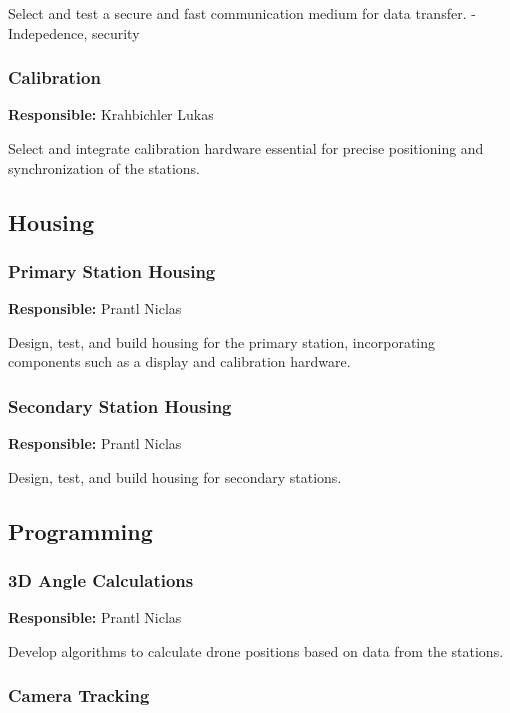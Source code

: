 Select and test a secure and fast communication medium for data transfer. - Indepedence, security

\subsubsection{Calibration}

\textbf{Responsible:} Krahbichler Lukas

Select and integrate calibration hardware essential for precise positioning and synchronization of the stations.

\subsection{Housing}

\subsubsection{Primary Station Housing}

\textbf{Responsible:} Prantl Niclas

Design, test, and build housing for the primary station, incorporating components such as a display and calibration hardware.

\subsubsection{Secondary Station Housing}

\textbf{Responsible:} Prantl Niclas

Design, test, and build housing for secondary stations.

\subsection{Programming}

\subsubsection{3D Angle Calculations}

\textbf{Responsible:} Prantl Niclas

Develop algorithms to calculate drone positions based on data from the stations.

\subsubsection{Camera Tracking}

